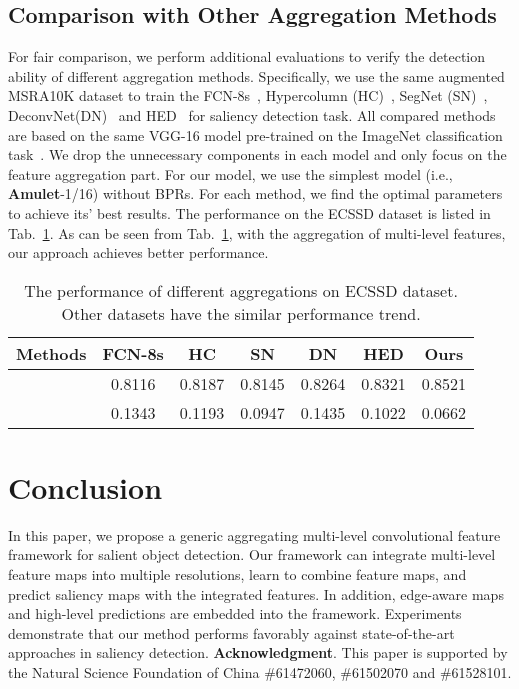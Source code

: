\documentclass[10pt,twocolumn,letterpaper]{article}
\begin{document}
\subsection{Comparison with Other Aggregation Methods}
For fair comparison, we perform additional evaluations to verify the detection ability of different aggregation methods.
Specifically, we use the same augmented MSRA10K dataset to train the FCN-8s~\cite{long2015fully}, Hypercolumn (HC)~\cite{hariharan2015hypercolumns}, SegNet (SN)~\cite{segnet}, DeconvNet(DN)~\cite{noh2015learning} and HED~\cite{xie2015holistically} for saliency detection task.
All compared methods are based on the same VGG-16 model pre-trained on the ImageNet classification task~\cite{simonyan2014very}.
We drop the unnecessary components in each model and only focus on the feature aggregation part.
For our model, we use the simplest model (i.e., \textbf{Amulet}-1/16) without BPRs.
For each method, we find the optimal parameters to achieve its' best results.
The performance on the ECSSD dataset is listed in Tab.~\ref{table:aggregation}. As can be seen from Tab.~\ref{table:aggregation}, with the aggregation of multi-level features, our approach achieves better performance.
\begin{table}
\begin{center}
\begin{tabular}{|c|c|c|c|c|c|c|}
\hline
Methods &\textbf{FCN-8s}&\textbf{HC}&\textbf{SN}&\textbf{DN}&\textbf{HED}&\textbf{Ours}\\
\hline
&0.8116&0.8187& 0.8145 & 0.8264 &0.8321&0.8521        \\
\hline
    &0.1343&0.1193& 0.0947& 0.1435& 0.1022&0.0662       \\
\hline
\end{tabular}
\end{center}
\vspace{-3mm}
\caption{The performance of different aggregations on ECSSD dataset. Other datasets have the similar performance trend.}
\label{table:aggregation}
\vspace{-6mm}
\end{table}
\section{Conclusion}

In this paper, we propose a generic aggregating multi-level convolutional feature framework for salient object detection.
Our framework can integrate multi-level feature maps into multiple resolutions, learn to combine feature maps, and predict saliency maps with the integrated features.
In addition, edge-aware maps and high-level predictions are embedded into the framework.
Experiments demonstrate that our method performs favorably against state-of-the-art approaches in saliency detection.
\vspace{-2mm}
{\small {\flushleft\textbf{Acknowledgment}}.
This paper is supported by the Natural Science Foundation of China \#61472060, \#61502070 and \#61528101.}
\vspace{-5mm}
{\small


}
\end{document}
